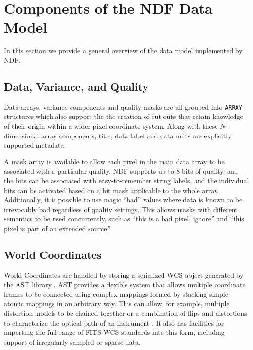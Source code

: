 \documentclass[11pt,twoside]{article}
\begin{document}
\section{Components of the NDF Data Model}

In this section we provide a general overview of the data model
implemented by NDF.

\subsection{Data, Variance, and Quality}

Data arrays, variance components and quality masks are all grouped
into \texttt{ARRAY} structures which also support the the creation of
cut-outs that retain knowledge of their origin within a wider pixel
coordinate system.  Along with these $N$-dimensional array components,
title, data label and data units are explicitly supported metadata.

A mask array is available to allow each pixel in the main data array
to be associated with a particular quality. NDF supports up to 8 bits
of quality, and the bits can be associated with easy-to-remember
string labels, and the individual bits can be activated based on a bit
mask applicable to the whole array. Additionally, it is possible to
use magic ``bad'' values where data is known to be irrevocably bad
regardless of quality settings. This allows masks with different
semantics to be used concurrently, such as ``this is a bad pixel,
ignore'' and ``this pixel is part of an extended source.''

\subsection{World Coordinates}

World Coordinates are handled by storing a serialized WCS object
generated by the AST library \citep{1998ASPC..145...41W}. AST provides
a flexible system that allows multiple coordinate frames to be
connected using complex mappings formed by stacking simple atomic
mappings in an arbitrary way. This can allow, for example, multiple
distortion models to be chained together \citep[such as required
by][]{2013ASPC..475...49H} or a combination of flips and distortions
to characterize the optical path of an instrument \citep[as used by
SCUBA-2,][]{2013MNRAS.430.2513H}. It also has facilities for importing
the full range of FITS-WCS standards \citep[see
e.g.][]{2006A&A...446..747G,2012ASPC..461..825B} into this form,
including support of irregularly sampled or sparse data.
\end{document}
